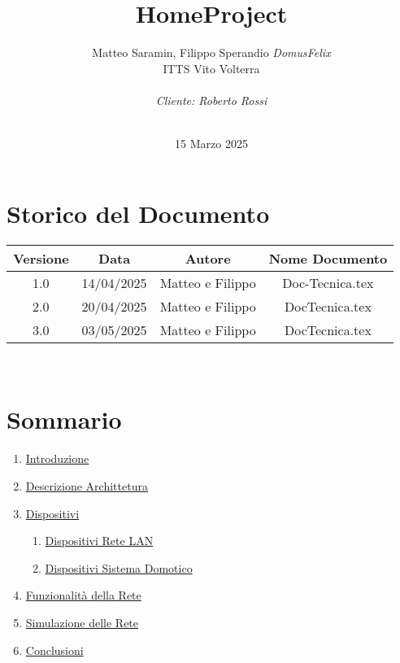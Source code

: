\documentclass[italian, 12pt, a4paper]{article}
\title{\huge{HomeProject}}
\author{Matteo Saramin, Filippo Sperandio \textit{DomusFelix} \\ {\small ITTS Vito Volterra} \\ \\ \emph{Cliente: Roberto Rossi}}
\date{\version\\ 15 Marzo 2025}
\begin{document}
\maketitle
\section*{Storico del Documento}
\begin{center}
    \renewcommand{\arraystretch}{1.5} %
    \begin{tabular}{|c|c|c|c|}
        \hline
        \rowcolor{violet!30}
        Versione & Data & Autore & Nome Documento \\
        \hline
        1.0 & 14/04/2025 & Matteo e Filippo & Doc-Tecnica.tex \\
        \hline
        2.0 & 20/04/2025 & Matteo e Filippo & DocTecnica.tex \\
        \hline
        3.0 & 03/05/2025 & Matteo e Filippo & DocTecnica.tex \\
        \hline
    \end{tabular}\\[4mm]
\end{center}
\clearpage
\section*{Sommario}
\begin{enumerate}
    \item \hyperref[sec:introduzione]{\Large Introduzione}
    \item \hyperref[sec:descrizione]{\Large Descrizione Archittetura}
    \item \hyperref[sec:dispositivi]{\Large Dispositivi}
    \begin{enumerate}
        \item \hyperref[sec:lan]{Dispositivi Rete LAN}
        \item \hyperref[sec:domotico]{Dispositivi Sistema Domotico}
    \end{enumerate}
    \item \hyperref[sec:progettazione]{\Large Funzionalità della Rete}
    \item \hyperref[sec:simulazione]{\Large Simulazione delle Rete}
    \item \hyperref[sec:conclusioni]{\Large Conclusioni}
\end{enumerate}
\clearpage
\end{document}
